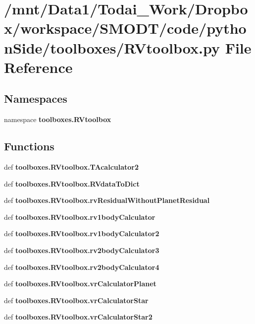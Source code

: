 \section{/mnt/\-Data1/\-Todai\-\_\-\-Work/\-Dropbox/workspace/\-S\-M\-O\-D\-T/code/python\-Side/toolboxes/\-R\-Vtoolbox.py File Reference}
\label{_r_vtoolbox_8py}
\subsection*{Namespaces}
\begin{DoxyCompactItemize}
\item 
namespace {\bf toolboxes.\-R\-Vtoolbox}
\end{DoxyCompactItemize}
\subsection*{Functions}
\begin{DoxyCompactItemize}
\item 
def {\bf toolboxes.\-R\-Vtoolbox.\-T\-Acalculator2}
\item 
def {\bf toolboxes.\-R\-Vtoolbox.\-R\-Vdata\-To\-Dict}
\item 
def {\bf toolboxes.\-R\-Vtoolbox.\-rv\-Residual\-Without\-Planet\-Residual}
\item 
def {\bf toolboxes.\-R\-Vtoolbox.\-rv1body\-Calculator}
\item 
def {\bf toolboxes.\-R\-Vtoolbox.\-rv1body\-Calculator2}
\item 
def {\bf toolboxes.\-R\-Vtoolbox.\-rv2body\-Calculator3}
\item 
def {\bf toolboxes.\-R\-Vtoolbox.\-rv2body\-Calculator4}
\item 
def {\bf toolboxes.\-R\-Vtoolbox.\-vr\-Calculator\-Planet}
\item 
def {\bf toolboxes.\-R\-Vtoolbox.\-vr\-Calculator\-Star}
\item 
def {\bf toolboxes.\-R\-Vtoolbox.\-vr\-Calculator\-Star2}
\end{DoxyCompactItemize}

